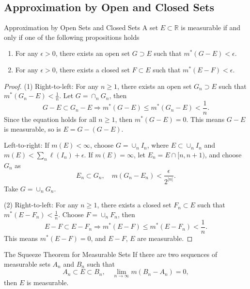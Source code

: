 \subsection{Approximation by Open and Closed Sets}

\begin{theorem}{Approximation by Open Sets and Closed Sets}{}
  A set $E \subset \mathbb{R}$ is measurable if and only if one of the following propositions holds
  \begin{enumerate}
  \item For any $\epsilon > 0$, there exists an open set $G \supset E$ such that
    $m^{\ast}(G - E) < \epsilon$.
  \item For any $\epsilon > 0$, there exists a closed set $F \subset E$ such that
    $m^{\ast}(E - F) < \epsilon$.
  \end{enumerate}
\end{theorem}

\begin{proof}
  (1) Right-to-left: For any $n \geq 1$, there exists an open set $G_n \supset E$ such that
  $m^{\ast}(G_n - E) < \frac{1}{n}$.
  Let $G = \cap_n G_n$, then
  \begin{equation}
    G - E \subset G_n - E \Rightarrow m^{\ast}(G - E) \leq m^{\ast}(G_n - E) < \frac{1}{n}.
  \end{equation}
  Since the equation holds for all $n \geq 1$, then $m^{\ast}(G - E) = 0$.
  This means $G - E$ is measurable, so is $E = G - (G - E)$.

  Left-to-right: If $m(E) < \infty$, choose $G = \cup_n I_n$, where $E \subset \cup_n I_n$
  and $m(E) < \sum_n \ell(I_n) + \epsilon$.
  If $m(E) = \infty$, let $E_n = E \cap [n, n+1)$, and choose $G_n$ as
  \begin{equation}
    E_n \subset G_n, \quad m(G_n - E_n) < \frac{\epsilon}{2^{|n|}}.
  \end{equation}
  Take $G = \cup_n G_n$.

  (2) Right-to-left: For any $n \geq 1$, there exists a closed set $F_n \subset E$ such that
  $m^{\ast}(E - F_n) < \frac{1}{n}$. Choose $F = \cup_n F_n$, then
  \begin{equation}
    E - F \subset E - F_n \Rightarrow m^{\ast}(E - F) \leq m^{\ast}(E - F_n) < \frac{1}{n}.
  \end{equation}
  This means $m^{\ast}(E - F) = 0$, and $E - F$, $E$ are measurable.
\end{proof}

\begin{theorem}{The Squeeze Theorem for Measurable Sets}{}
  If there are two sequences of measurable sets $A_n$ and $B_n$ such that
  \begin{equation}
    A_n \subset E \subset B_n, \quad \lim \limits _{n \rightarrow \infty} m(B_n - A_n) = 0,
  \end{equation}
  then $E$ is measurable.
\end{theorem}

